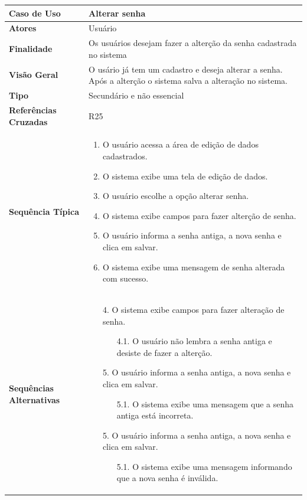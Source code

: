 \documentclass[a4paper,11pt]{article}
\begin{document}
\begin{table}[H]
		\begin{tabularx}{\textwidth}{|l|X|}
		\hline
			\textbf{Caso de Uso} &  Alterar senha \\ \hline
			\textbf{Atores} & Usuário  \\ \hline
			\textbf{Finalidade} &  Os usuários desejam fazer a alterção da senha cadastrada no sistema \\ \hline
			\textbf{Visão Geral} & O usário já tem um cadastro e deseja alterar a senha. Após a alterção o sistema salva a alteração no sistema. \\ \hline
			\textbf{Tipo} & Secundário e não essencial \\ \hline
			\textbf{Referências Cruzadas} & R25 \\ \hline
			\textbf{Sequência Típica} & 
			\begin{enumerate}
			\item O usuário acessa a área de edição de dados cadastrados.
			\item O sistema exibe uma tela de edição de dados.
			\item O usuário escolhe a opção alterar senha.
			\item O sistema exibe campos para fazer alterção de senha.
			\item O usuário informa a senha antiga, a nova senha e clica em salvar.
			\item O sistema exibe uma mensagem de senha alterada com sucesso.
			\end{enumerate} \\ \hline
			
			\textbf{Sequências Alternativas} & 
			\begin{itemize}
				\item[4.] O sistema exibe campos para fazer alteração de senha.
				\begin{itemize}
					\item[4.1.] O usuário não lembra a senha antiga e desiste de fazer a alterção.
				\end{itemize}
				\item[5.] O usuário informa a senha antiga, a nova senha e clica em salvar.			
				\begin{itemize}
					\item[5.1.] O sistema exibe uma mensagem que a senha antiga está incorreta.
				\end{itemize}
				\item[5.] O usuário informa a senha antiga, a nova senha e clica em salvar.			
				\begin{itemize}
					\item[5.1.] O sistema exibe uma mensagem informando que a nova senha é inválida.
			\end{itemize}			
			
			\end{itemize} \\ \hline
		\end{tabularx}
\end{table}
\end{document}
